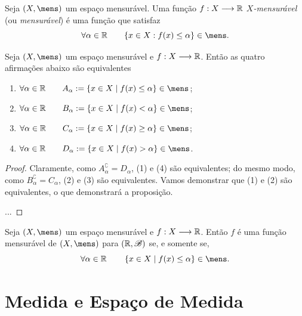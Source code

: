 \begin{defi}
	Seja $(X,\mens)$ um espaço mensurável. Uma função $f: X \longrightarrow \mathbb{R}$ \emph{$X$-mensurável} (ou \emph{mensurável}) é uma função que satisfaz
	\begin{equation*}
	\forall \alpha \in \R \qquad \{x \in X : f(x) \leq \alpha\} \in \mens.
	\end{equation*}
\end{defi}

\begin{prop}
	Seja $(X,\mens)$ um espaço mensurável e $f: X \longrightarrow \mathbb{R}$. Então as quatro afirmações abaixo são equivalentes
	\begin{enumerate}
	\item $\forall \alpha \in \R \qquad A_\alpha := \set{x \in X}{f(x) \leq \alpha} \in \mens$;
	\item $\forall \alpha \in \R \qquad B_\alpha := \set{x \in X}{f(x) < \alpha} \in \mens$;
	\item $\forall \alpha \in \R \qquad C_\alpha := \set{x \in X}{f(x) \geq \alpha} \in \mens$;
	\item $\forall \alpha \in \R \qquad D_\alpha := \set{x \in X}{f(x) > \alpha} \in \mens$.
	\end{enumerate}
\end{prop}
\begin{proof}
	Claramente, como $A_\alpha^\complement = D_\alpha$, (1) e (4) são equivalentes; do mesmo modo, como $B_\alpha^\complement = C_\alpha$, (2) e (3) são equivalentes. Vamos demonstrar que (1) e (2) são equivalentes, o que demonstrará a proposição.
	
	...	
\end{proof}

\begin{prop}
	Seja $(X,\mens)$ um espaço mensurável e $f: X \longrightarrow \mathbb{R}$. Então $f$ é uma função mensurável de $(X,\mens)$ para $(\mathbb{R},\mathscr{B})$ se, e somente se,
	\begin{equation*}
	\forall \alpha \in \R \qquad \set{x \in X}{f(x) \leq \alpha} \in \mens.
	\end{equation*}
\end{prop}

\newpage









\section{Medida e Espaço de Medida}

